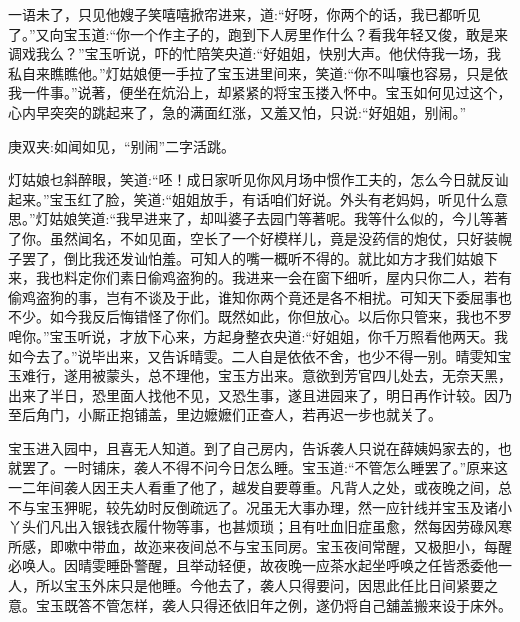 \begin{parag}
    一语未了，只见他嫂子笑嘻嘻掀帘进来，道:“好呀，你两个的话，我已都听见了。”又向宝玉道:“你一个作主子的，跑到下人房里作什么？看我年轻又俊，敢是来调戏我么？”宝玉听说，吓的忙陪笑央道:“好姐姐，快别大声。他伏侍我一场，我私自来瞧瞧他。”灯姑娘便一手拉了宝玉进里间来，笑道:“你不叫嚷也容易，只是依我一件事。”说著，便坐在炕沿上，却紧紧的将宝玉搂入怀中。宝玉如何见过这个，心内早突突的跳起来了，急的满面红涨，又羞又怕，只说:“好姐姐，别闹。”\begin{note}庚双夹:如闻如见，“别闹”二字活跳。\end{note}灯姑娘乜斜醉眼，笑道:“呸！成日家听见你风月场中惯作工夫的，怎么今日就反讪起来。”宝玉红了脸，笑道:“姐姐放手，有话咱们好说。外头有老妈妈，听见什么意思。”灯姑娘笑道:“我早进来了，却叫婆子去园门等著呢。我等什么似的，今儿等著了你。虽然闻名，不如见面，空长了一个好模样儿，竟是没药信的炮仗，只好装幌子罢了，倒比我还发讪怕羞。可知人的嘴一概听不得的。就比如方才我们姑娘下来，我也料定你们素日偷鸡盗狗的。我进来一会在窗下细听，屋内只你二人，若有偷鸡盗狗的事，岂有不谈及于此，谁知你两个竟还是各不相扰。可知天下委屈事也不少。如今我反后悔错怪了你们。既然如此，你但放心。以后你只管来，我也不罗唣你。”宝玉听说，才放下心来，方起身整衣央道:“好姐姐，你千万照看他两天。我如今去了。”说毕出来，又告诉晴雯。二人自是依依不舍，也少不得一别。晴雯知宝玉难行，遂用被蒙头，总不理他，宝玉方出来。意欲到芳官四儿处去，无奈天黑，出来了半日，恐里面人找他不见，又恐生事，遂且进园来了，明日再作计较。因乃至后角门，小厮正抱铺盖，里边嬷嬷们正查人，若再迟一步也就关了。
\end{parag}


\begin{parag}
    宝玉进入园中，且喜无人知道。到了自己房内，告诉袭人只说在薛姨妈家去的，也就罢了。一时铺床，袭人不得不问今日怎么睡。宝玉道:“不管怎么睡罢了。”原来这一二年间袭人因王夫人看重了他了，越发自要尊重。凡背人之处，或夜晚之间，总不与宝玉狎昵，较先幼时反倒疏远了。况虽无大事办理，然一应针线并宝玉及诸小丫头们凡出入银钱衣履什物等事，也甚烦琐；且有吐血旧症虽愈，然每因劳碌风寒所感，即嗽中带血，故迩来夜间总不与宝玉同房。宝玉夜间常醒，又极胆小，每醒必唤人。因晴雯睡卧警醒，且举动轻便，故夜晚一应茶水起坐呼唤之任皆悉委他一人，所以宝玉外床只是他睡。今他去了，袭人只得要问，因思此任比日间紧要之意。宝玉既答不管怎样，袭人只得还依旧年之例，遂仍将自己舖盖搬来设于床外。
\end{parag}


